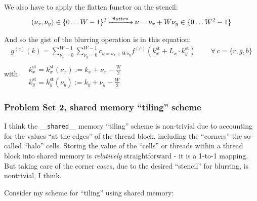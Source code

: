\documentclass[10pt]{amsart}
\begin{document}
\begin{multicols*}{2}
We also have to apply the flatten functor on the stencil:
\[
\begin{gathered}
  (\nu_x,\nu_y) \in \lbrace 0 \dots W-1\rbrace^2 \xmapsto{ \text{ flatten } } \nu = \nu_x + W \nu_y \in \lbrace 0 \dots W^2 -1 \rbrace
  \end{gathered}
\]

And so the gist of the blurring operation is in this equation:
\begin{equation}
\begin{gathered}
  g^{(c)}(k) = \sum_{\nu_x=0}^{W-1} \sum_{\nu_y =0}^{W-1} c_{\nu = \nu_x + W\nu_y} f^{(c)}(k_x^{\text{st}} + L_x \cdot k_y^{\text{st}} ) \qquad \, \forall \, c = \lbrace r,g,b\rbrace 
  \end{gathered}
  \end{equation}
with $\begin{aligned} & \quad \\
  & k_x^{\text{st}} = k_x^{\text{st}}(\nu_x) := k_x + \nu_x - \frac{W}{2} \\ 
  & k_y^{\text{st}} = k_y^{\text{st}}(\nu_y) := k_y + \nu_y - \frac{W}{2} 
  \end{aligned}$

\subsubsection{Problem Set 2, shared memory ``tiling'' scheme}

I think the \verb|__shared__| memory ``tiling'' scheme is non-trivial due to accounting for the values ``at the edges'' of the thread block, including the ``corners'' the so-called ``halo'' cells.  Storing the value of the ``cells'' or threads within a thread block into shared memory is \emph{relatively} straightforward - it is a 1-to-1 mapping.  But taking care of the corner cases, due to the desired ``stencil'' for blurring, is nontrivial, I think.

Consider my scheme for ``tiling'' using shared memory:


\end{multicols*}
\end{document}
